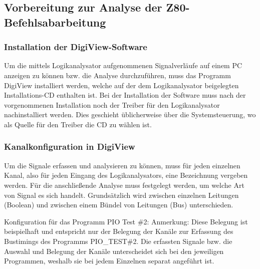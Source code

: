 \subsection{Vorbereitung zur Analyse der Z80-Befehlsabarbeitung}
\subsubsection{Installation der DigiView-Software}
Um die mittels Logikanalysator aufgenommenen Signalverläufe auf einem PC anzeigen zu können bzw. die Analyse durchzuführen, muss das Programm DigiView installiert werden, welche auf der dem Logikanalysator beigelegten Installations-CD enthalten ist. Bei der Installation der Software muss nach der vorgenommenen Installation noch der Treiber für den Logikanalysator nachinstalliert werden. Dies geschieht üblicherweise über die Systemsteuerung, wo als Quelle für den Treiber die CD zu wählen ist.

\subsubsection{Kanalkonfiguration in DigiView}
\label{sec:z80-digiview-kanal}
Um die Signale erfassen und analysieren zu können, muss für jeden einzelnen Kanal, also für jeden Eingang des Logikanalysators, eine Bezeichnung vergeben werden. Für die anschließende Analyse muss festgelegt werden, um welche Art von Signal es sich handelt. Grundsätzlich wird zwischen einzelnen Leitungen (Boolean) und zwischen einem Bündel von Leitungen (Bus) unterschieden.

Konfiguration für das Programm PIO Test \#2:
Anmerkung: Diese Belegung ist beispielhaft und entspricht nur der Belegung der Kanäle zur Erfassung des Bustimings des Programms PIO\_TEST\#2. Die erfassten Signale bzw. die Auswahl und Belegung der Kanäle unterscheidet sich bei den jeweiligen Programmen, weshalb sie bei jedem Einzelnen separat angeführt ist.

